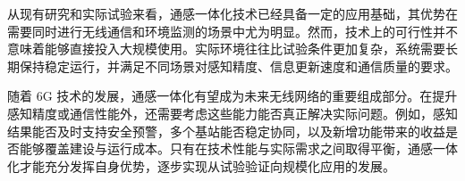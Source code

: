 \documentclass[12pt,a4paper,UTF8,fontset=fandol]{ctexart}
\begin{document}
从现有研究和实际试验来看，通感一体化技术已经具备一定的应用基础，其优势在需要同时进行无线通信和环境监测的场景中尤为明显。然而，技术上的可行性并不意味着能够直接投入大规模使用。实际环境往往比试验条件更加复杂，系统需要长期保持稳定运行，并满足不同场景对感知精度、信息更新速度和通信质量的要求。

随着 6G 技术的发展，通感一体化有望成为未来无线网络的重要组成部分。在提升感知精度或通信性能外，还需要考虑这些能力能否真正解决实际问题。例如，感知结果能否及时支持安全预警，多个基站能否稳定协同，以及新增功能带来的收益是否能够覆盖建设与运行成本。只有在技术性能与实际需求之间取得平衡，通感一体化才能充分发挥自身优势，逐步实现从试验验证向规模化应用的发展。

\clearpage

\printbibliography[
    heading=bibintoc,
    title={参考文献}
]
\end{document}
